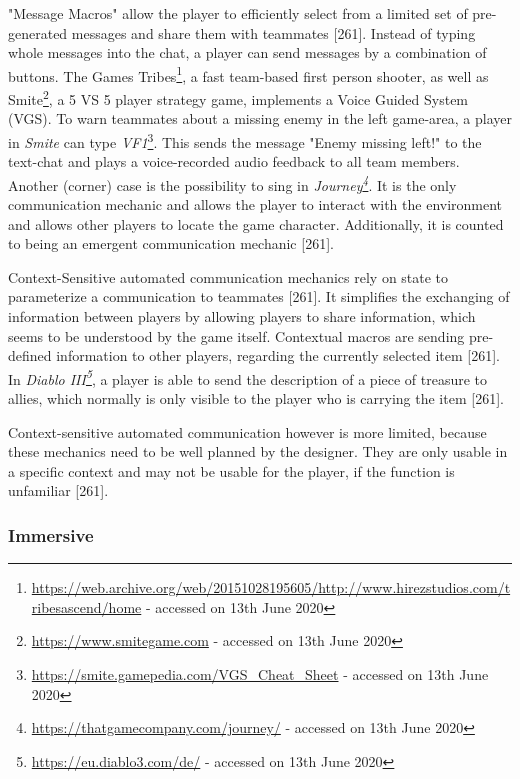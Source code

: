"Message Macros" allow the player to efficiently select from a limited set of pre-generated messages and share them with teammates \autocite{Toups2014ATheory}[261]. Instead of typing whole messages into the chat, a player can send messages by a combination of buttons.
The Games Tribes\footnote{\url{https://web.archive.org/web/20151028195605/http://www.hirezstudios.com/tribesascend/home} - accessed on 13th June 2020}, a fast team-based first person shooter, as well as Smite\footnote{\url{https://www.smitegame.com} - accessed on 13th June 2020}, a 5 VS 5 player strategy game, implements a Voice Guided System (VGS). To warn teammates about a missing enemy in the left game-area, a player in \textit{Smite} can type \textit{VF1}\footnote{\url{https://smite.gamepedia.com/VGS_Cheat_Sheet} - accessed on 13th June 2020}. This sends the message "Enemy missing left!" to the text-chat and plays a voice-recorded audio feedback to all team members.
Another (corner) case is the possibility to sing in \textit{Journey\footnote{\url{https://thatgamecompany.com/journey/} - accessed on 13th June 2020}}. It is the only communication mechanic and allows the player to interact with the environment and allows other players to locate the game character. Additionally, it is counted to being an emergent communication mechanic \autocite{Toups2014ATheory}[261].


Context-Sensitive automated communication mechanics rely on state to parameterize a communication to teammates \autocite{Toups2014ATheory}[261]. It simplifies the exchanging of information between players by allowing players to share information, which seems to be understood by the game itself.
Contextual macros are sending pre-defined information to other players, regarding the currently selected item \autocite{Toups2014ATheory}[261]. In \textit{Diablo III\footnote{\url{https://eu.diablo3.com/de/} - accessed on 13th June 2020}}, a player is able to send the description of a piece of treasure to allies, which normally is only visible to the player who is carrying the item \autocite{Toups2014ATheory}[261].

Context-sensitive automated communication however is more limited, because these mechanics need to be well planned by the designer. They are only usable in a specific context and may not be usable for the player, if the function is unfamiliar \autocite{Toups2014ATheory}[261]. 


\subsubsection{Immersive}
\label{section:Immersive}

